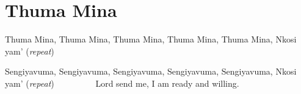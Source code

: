 \starttocol
\chapter{Thuma Mina}
\nexttocol
\hfill{\it }
\stoptocol
\starttocol
\startlines
T{\sc huma} Mina,
Thuma Mina, 
Thuma Mina, 
Thuma Mina,
Thuma Mina, Nkosi yam'
          \hfill({\it repeat})~~~~~~~~~

Sengiyavuma,
Sengiyavuma, 
Sengiyavuma, 
Sengiyavuma, 
Sengiyavuma, Nkosi yam'
          \hfill({\it repeat})~~~~~~~~~
\stoplines
\nexttocol
Lord send me, I am ready and willing.
\stoptocol
